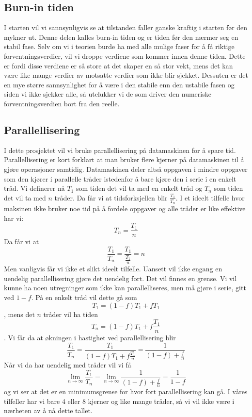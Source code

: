 \documentclass[reprint,english,notitlepage]{revtex4-2}  %
\begin{document}
\subsection{Burn-in tiden}
I starten vil vi sannsynligvis se at tilstanden faller ganske kraftig i starten før den mykner ut. Denne delen kalles burn-in tiden og er tiden før den nærmer seg en stabil fase. Selv om vi i teorien burde ha med alle mulige faser for å få riktige forventningsverdier, vil vi droppe verdiene som kommer innen denne tiden. Dette er fordi disse verdiene er så store at det skaper en så stor vekt, mens det kan være like mange verdier av motsatte verdier som ikke blir sjekket. Dessuten er det en mye større sannsynlighet for å være i den stabile enn den ustabile fasen og siden vi ikke sjekker alle, så utelukker vi de som driver den numeriske forventningsverdien bort fra den reelle.
\subsection{Parallellisering}
I dette prosjektet vil vi bruke parallellisering på datamaskinen for å spare tid. Parallellisering er kort forklart at man bruker flere kjerner på datamaskinen til å gjøre operasjoner samtidig. Datamaskinen deler altså oppgaven i mindre oppgaver som den kjører i parallelle tråder istedenfor å bare kjøre den i serie i en enkelt tråd. Vi definerer nå $T_1$ som tiden det vil ta med en enkelt tråd og $T_n$ som tiden det vil ta med $n$ tråder. Da får vi at tidsforksjellen blir $\frac{T_1}{T_n}$. I et ideelt tilfelle hvor maksinen ikke bruker noe tid på å fordele oppgaver og alle tråder er like effektive har vi:
$$
T_n=\frac{T_1}{n}
$$
Da får vi at
$$
\frac{T_1}{T_n}=\frac{T_1}{\frac{T_1}{n}}=n
$$
Men vanligvis får vi ikke et slikt ideelt tilfelle. Uansett vil ikke engang en uendelig parallellisering gjøre det uendelig fort. Det vil finnes en grense. Vi vil kunne ha noen utregninger som ikke kan parallelliseres, men må gjøre i serie, gitt ved $1-f$. På en enkelt tråd vil dette gå som $$T_1=(1-f)T_1+fT_1$$, mens det $n$ tråder vil ha tiden $$T_n=(1-f)T_1+f\frac{T_1}{n}$$. Vi får da at økningen i hastighet ved parallellisering blir
$$
\frac{T_1}{T_n}=\frac{T_1}{(1-f)T_1+f\frac{T_1}{n}}=\frac{1}{(1-f)+\frac{f}{n}}
$$
Når vi da har uendelig med tråder vil vi få
$$
\lim_{n\rightarrow \infty}\frac{T_1}{T_n}=\lim_{n\rightarrow \infty}\frac{1}{(1-f)+\frac{f}{n}}=\frac{1}{1-f}
$$
og vi ser at det er en minimumsgrense for hvor fort parallellisering kan gå. I våres tilfeller har vi bare 4 eller 8 kjerner og like mange tråder, så vi vil ikke være i nærheten av å nå dette tallet.
\end{document}
